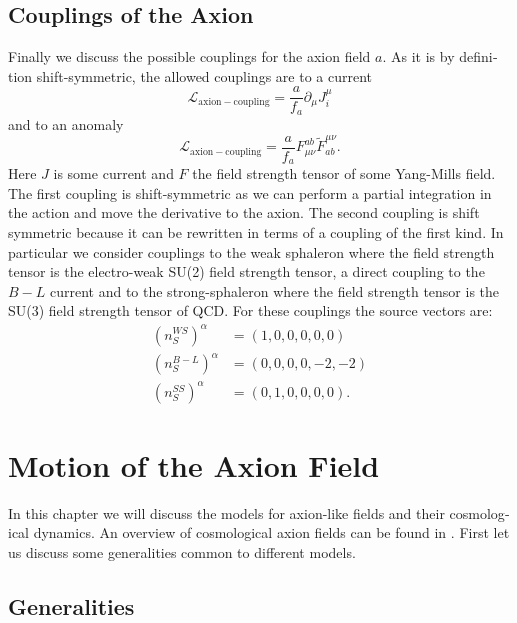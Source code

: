 \documentclass[master,       %
               twoside,        %
               BCOR10mm,       %
               english,ngerman, %
               ]{GAUBM}
\begin{document}
\begin{otherlanguage}{english}
\section{Couplings of the Axion}
Finally we discuss the possible couplings for the axion field $a$. As it is by definition shift-symmetric, the allowed couplings are to a current
\begin{equation}
	\mathcal{L}_\mathrm{axion-coupling} = \frac{a}{f_a} \partial_\mu J^\mu_i
\end{equation}
and to an anomaly
\begin{equation}
	\mathcal{L}_\mathrm{axion-coupling} = \frac{a}{f_a} F_{\mu \nu}^{ab} \tilde{F}_{ab}^{\mu \nu}.
\end{equation}
Here $J$ is some current and $F$ the field strength tensor of some Yang-Mills field.
The first coupling is shift-symmetric as we can perform a partial integration in the action and move the derivative to the axion.
The second coupling is shift symmetric because it can be rewritten in terms of a coupling of the first kind.
In particular we consider couplings to the weak sphaleron where the field strength tensor is the electro-weak SU(2) field strength tensor,
a direct coupling to the $B - L$ current and to the strong-sphaleron where the field strength tensor is the SU(3) field strength tensor of QCD.
For these couplings the source vectors are:
\begin{align}
    (n_S^{WS} )^\alpha &= (1, 0, 0, 0, 0, 0)\nonumber \\
	(n_S^{B-L})^\alpha &= (0, 0, 0, 0, -2, -2) \nonumber \\
	(n_S^{SS} )^\alpha &= (0, 1, 0, 0, 0, 0).
\end{align}


\chapter{Motion of the Axion Field}
\label{sec:motion_of_the_axion_field}

In this chapter we will discuss the models for axion-like fields and their cosmological dynamics.
An overview of cosmological axion fields can be found in \cite{MarshAxionCosmo}.
First let us discuss some generalities common to different models.

\section{Generalities}


\end{otherlanguage}
\end{document}
